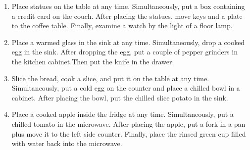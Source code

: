 \documentclass{article}
\begin{document}
\begin{enumerate}
    \item Place statues on the table at any time. Simultaneously, put a box containing a credit card on the couch. After placing the statues, move keys and a plate to the coffee table. Finally, examine a watch by the light of a floor lamp.
    \item Place a warmed glass in the sink at any time. Simultaneously, drop a cooked egg in the sink. After dropping the egg, put a couple of pepper grinders in the kitchen cabinet.Then put the knife in the drawer.
    \item Slice the bread, cook a slice, and put it on the table at any time. Simultaneously, put a cold egg on the counter and place a chilled bowl in a cabinet. After placing the bowl, put the chilled slice potato in the sink.
    \item Place a cooked apple inside the fridge at any time. Simultaneously, put a chilled tomato in the microwave. After placing the apple, put a fork in a pan plus move it to the left side counter. Finally, place the rinsed green cup filled with water back into the microwave.
\end{enumerate}
\end{document}
